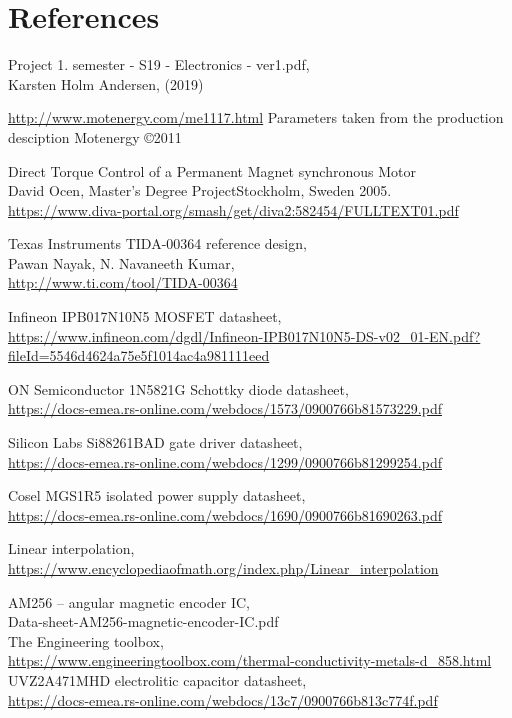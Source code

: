 \section{References}
\label{sec:references}


\begin{thebibliography}{9}
Project 1. semester - S19 - Electronics - ver1.pdf, \\
Karsten Holm Andersen, (2019)

\url{http://www.motenergy.com/me1117.html}
Parameters taken from the production desciption
Motenergy \copyright 2011

Direct Torque Control of a Permanent Magnet synchronous Motor\\
David Ocen, Master's Degree ProjectStockholm, Sweden 2005.\\
\url{https://www.diva-portal.org/smash/get/diva2:582454/FULLTEXT01.pdf}

Texas Instruments TIDA-00364 reference design, \\
Pawan Nayak, N. Navaneeth Kumar, \\
\url{http://www.ti.com/tool/TIDA-00364}

Infineon IPB017N10N5  MOSFET datasheet, \\
\url{https://www.infineon.com/dgdl/Infineon-IPB017N10N5-DS-v02_01-EN.pdf?fileId=5546d4624a75e5f1014ac4a981111eed}

ON Semiconductor 1N5821G Schottky diode datasheet, \\
\url{https://docs-emea.rs-online.com/webdocs/1573/0900766b81573229.pdf}

Silicon Labs Si88261BAD gate driver datasheet, \\
\url{https://docs-emea.rs-online.com/webdocs/1299/0900766b81299254.pdf}

Cosel MGS1R5 isolated power supply datasheet, \\
\url{https://docs-emea.rs-online.com/webdocs/1690/0900766b81690263.pdf}

Linear interpolation,  \\
\url{https://www.encyclopediaofmath.org/index.php/Linear_interpolation}

AM256 – angular magnetic encoder IC, \\
Data-sheet-AM256-magnetic-encoder-IC.pdf \\

The Engineering toolbox, \\
\url{https://www.engineeringtoolbox.com/thermal-conductivity-metals-d_858.html} \\

UVZ2A471MHD electrolitic capacitor datasheet, \\
\url{https://docs-emea.rs-online.com/webdocs/13c7/0900766b813c774f.pdf}

\end{thebibliography}